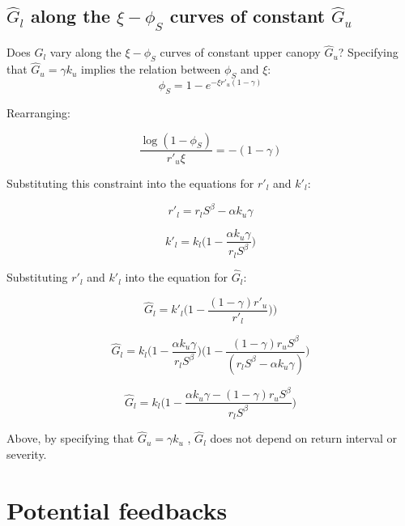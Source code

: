 \documentclass{article}
\begin{document}
  \subsection{$\hat G_l$ along the  $\xi - \phi_S$ curves of constant $\hat G_u$}

Does $G_l$ vary along the $\xi - \phi_S$ curves of constant  upper canopy $\hat G_u$?
Specifying that $\hat G_u = \gamma k_u$ implies the relation between $\phi_S$ and $\xi$:
$$\phi_S = 1- e^{-\xi r'_u (1-\gamma)}$$

Rearranging:

\begin{equation}
\frac{\log(1 - \phi_S)}{  r'_u \xi  }= -  (1 - \gamma )
\end{equation}


 Substituting this constraint into the equations for $r'_l$ and $k'_l$:

\begin{equation}
r'_l= r_l S^\beta   - \alpha k_u \gamma
\end{equation}

\begin{equation}
 k'_l  = k_l  \bigg(1  - \frac{\alpha k_u \gamma} { r_l S^\beta}\bigg)
\end{equation}


Substituting $r'_l$ and $k'_l$ into the equation for $\hat G_l$:

\begin{equation}
\hat{G}_l =
 		k'_l \big( 1 - \frac{(1 - \gamma) r'_u }{r'_l }  ) \big)
\end{equation}


\begin{equation}
\hat{G}_l =
 		  k_l  \bigg(1  - \frac{\alpha k_u \gamma} { r_l S^\beta}\bigg)
		  \bigg( 1 - \frac{(1 - \gamma) r_u  S^\beta }{(r_l S^\beta   - \alpha k_u \gamma)}   \bigg)
\end{equation}


\begin{equation}
\hat{G}_l =
 		  {k_l}
		  \bigg( 1 - \frac{\alpha k_u \gamma - (1 - \gamma) r_u  S^\beta}{r_l S^\beta }  \bigg)
\label{eq:constrained_G_l}
\end{equation}

Above, by specifying that  $\hat G_u = \gamma k_u$ ,  $\hat{G}_l$ does not depend on return interval or severity.


\section{Potential feedbacks}
\end{document}

